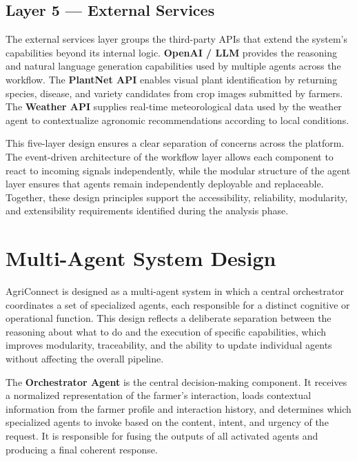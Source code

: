 \subsection*{Layer 5 — External Services}

The external services layer groups the third-party APIs that extend the system's capabilities beyond its internal logic. \textbf{OpenAI / LLM} provides the reasoning and natural language generation capabilities used by multiple agents across the workflow. The \textbf{PlantNet API} enables visual plant identification by returning species, disease, and variety candidates from crop images submitted by farmers. The \textbf{Weather API} supplies real-time meteorological data used by the weather agent to contextualize agronomic recommendations according to local conditions.

\vspace{0.5cm}

This five-layer design ensures a clear separation of concerns across the platform. The event-driven architecture of the workflow layer allows each component to react to incoming signals independently, while the modular structure of the agent layer ensures that agents remain independently deployable and replaceable. Together, these design principles support the accessibility, reliability, modularity, and extensibility requirements identified during the analysis phase.

\section{Multi-Agent System Design}

AgriConnect is designed as a multi-agent system in which a central orchestrator coordinates a set of specialized agents, each responsible for a distinct cognitive or operational function. This design reflects a deliberate separation between the reasoning about what to do and the execution of specific capabilities, which improves modularity, traceability, and the ability to update individual agents without affecting the overall pipeline.

The \textbf{Orchestrator Agent} is the central decision-making component. It receives a normalized representation of the farmer's interaction, loads contextual information from the farmer profile and interaction history, and determines which specialized agents to invoke based on the content, intent, and urgency of the request. It is responsible for fusing the outputs of all activated agents and producing a final coherent response.


